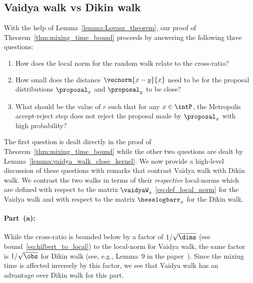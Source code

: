 \subsection{Vaidya walk vs Dikin walk} %
\label{sub:vaidya_vs_dikin}
With the help of Lemma~\ref{lemma:Lovasz_theorem}, our proof of Theorem~\ref{thm:mixing_time_bound} proceeds by answering the following three questions:
\begin{enumerate}[label=(\alph*)]
	\item How does the local norm for the random walk relate to the cross-ratio?
	\item How small does the distance $\vecnorm{x-y}{x}$ need to be for the proposal distributions $\proposal_x$ and $\proposal_y$ to be close?
	\item What should be the value of $r$ such that for any $x \in \intP$, the Metropolis accept-reject step does not reject the proposal made by $\proposal_x$ with high probability?
\end{enumerate}
The first question is dealt directly in the proof of Theorem~\ref{thm:mixing_time_bound} while the other two questions are dealt by Lemma~\ref{lemma:vaidya_walk_close_kernel}.
We now provide a high-level discussion of these questions with remarks that contrast Vaidya walk with Dikin walk.
We contrast the two walks in terms of their \emph{respective} local-norms which are defined with respect to the matrix $\vaidyaW_x$ \eqref{eq:def_local_norm} for the Vaidya walk and with respect to the matrix $\hesslogbarr_x$ for the Dikin walk.

\paragraph{Part~(a):} %
\label{par:part_a}
While the cross-ratio is bounded below by a factor of $1/\sqrt{\dims}$ (see bound~\eqref{eq:hilbert_to_local}) to the local-norm for Vaidya walk, the same factor is $1/\sqrt{\obs}$ for Dikin walk (see, e.g., Lemma~9 in the paper~\cite{sachdeva2016mixing}).
Since the mixing time is affected inversely by this factor, we see that Vaidya walk has an \order{\sqrt{\obs/\dims}} advantage over Dikin walk for this part.

